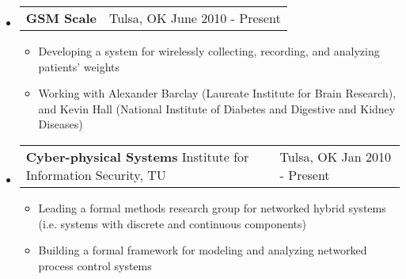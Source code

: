 \documentclass[letterpaper,11pt]{article}
\makeatletter
\newcommand{\resitem}[1]{\item \parbox[t]{4.6in}{#1} \vspace{-2pt}}
\newcommand{\resentry}[3][0pt]{
    \begin{tabular*}{0.9\textwidth}[t]{@{\hspace{#1}}p{5.0in-#1}@{\extracolsep{\fill}}p{0.75in}}
        #2 & #3
        \tabularnewline
    \end{tabular*} %
}
\newcommand{\ressubheading}[4]{
    \resentry{\textbf{#1} \newline #3}{#2 \newline #4}    
}
\makeatother
\begin{document}
\begin{itemize}
\item
	\ressubheading{GSM Scale}{Tulsa, OK}{}{June 2010 - Present}
	\begin{itemize}
		\resitem{Developing a system for wirelessly collecting, recording, and analyzing patients' weights}
		\resitem{Working with Alexander Barclay (Laureate Institute for Brain Research), and Kevin Hall (National Institute of Diabetes and Digestive and Kidney Diseases)}
	\end{itemize}

\item
	\ressubheading{Cyber-physical Systems}{Tulsa, OK}{Institute for Information Security, TU}{Jan 2010 - Present}
	\begin{itemize}
		\resitem{Leading a formal methods research group for networked hybrid systems (i.e. systems with discrete and continuous components)}
		\resitem{Building a formal framework for modeling and analyzing networked process control systems}
	\end{itemize}




\end{itemize}
\end{document}
